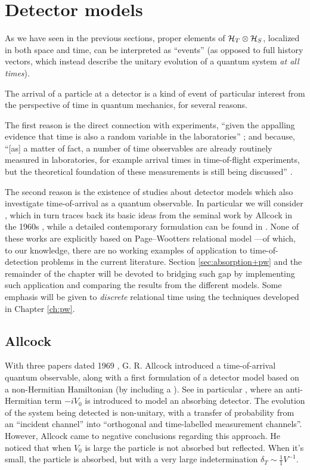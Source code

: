 \section{Detector models}

As we have seen in the previous sections,
proper elements of $\mathcal{H}_T \otimes \mathcal{H}_S$,
localized in both space and time,
can be interpreted as ``events''
(as opposed to full history vectors, which instead describe the unitary evolution
of a quantum system \emph{at all times}).

The arrival of a particle at a detector
is a kind of event
of particular interest from the perspective of time
in quantum mechanics, for several reasons.

The first reason
is the direct connection with experiments,
``given the appalling evidence that time is also a random variable in the laboratories''
\parencite[Sec. 4.1]{TQM2};
and because,
``{[as]} a matter of fact, a number of time observables are already routinely measured in laboratories,
for example arrival times in time-of-flight experiments,
but the theoretical foundation of these measurements is still being discussed''
\parencite[Preface to the First Ed.]{TQM1}.

The second reason is the existence of studies
about detector models which also investigate
time-of-arrival as a quantum observable.
In particular we will consider \cite{RuschhauptAbsorption},
which in turn traces back its basic ideas from the seminal work by Allcock
in the 1960s \parencite{Allcock-1, Allcock-2, Allcock-3},
while a detailed contemporary formulation can be found in
\cite{TQM2:Detector}.
None of these works are explicitly
based on Page--Wootters relational model ---of which, to our knowledge,
there are no working examples of application to
time-of-detection problems in the current literature.
Section \ref{sec:absorption+pw} and the remainder of the chapter
will be devoted to bridging such gap
by implementing such application
and comparing
the results from the different models.
Some emphasis will be given to
\emph{discrete} relational time
using the techniques developed in Chapter \ref{ch:pw}.

\subsection{Allcock}

With three papers dated 1969 \parencite{Allcock-1, Allcock-2, Allcock-3}, G. R. Allcock
introduced a time-of-arrival quantum observable,
along with a first formulation of a detector model based on a non-Hermitian
Hamiltonian (by including a ).
See in particular \cite[sec. II-IV]{Allcock-2}, where an anti-Hermitian term
$-iV_0$ is introduced to model an absorbing detector. The evolution of the system
being detected
is non-unitary, with a transfer of probability
from an ``incident channel''
into ``orthogonal and time-labelled measurement channels''.
However, Allcock came to negative conclusions regarding this approach.
He noticed that when $V_0$ is large the particle is not absorbed but reflected.
When it's small, the particle is absorbed, but
with a very large indetermination $\delta_T \sim \frac{1}{1}V^{-1}$.



